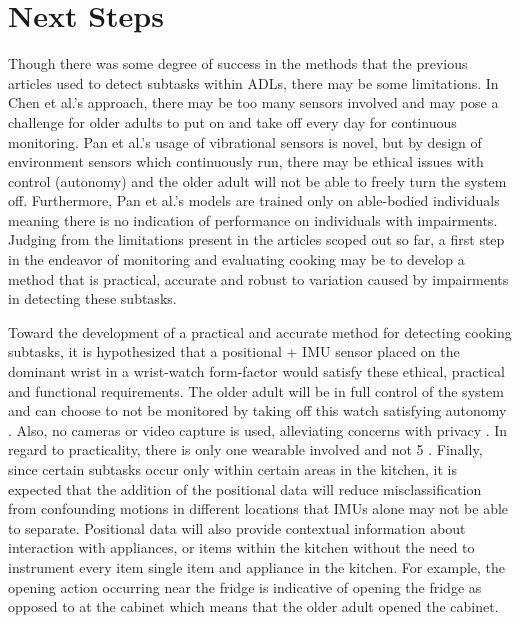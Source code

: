 \section{Next Steps}
Though there was some degree of success in the methods that the previous articles used to detect subtasks within ADLs, there may be some limitations. In Chen et al.'s approach, there may be too many sensors involved and may pose a challenge for older adults to put on and take off every day for continuous monitoring. Pan et al.'s usage of vibrational sensors is novel, but by design of environment sensors which continuously run, there may be ethical issues with control (autonomy) and the older adult will not be able to freely turn the system off. Furthermore, Pan et al.'s models are trained only on able-bodied individuals meaning there is no indication of performance on individuals with impairments. Judging from the limitations present in the articles scoped out so far, a first step in the endeavor of monitoring and evaluating cooking may be to develop a method that is practical, accurate and robust to variation caused by impairments in detecting these subtasks. 

Toward the development of a practical and accurate method for detecting cooking subtasks, it is hypothesized that a positional + IMU sensor placed on the dominant wrist in a wrist-watch form-factor would satisfy these ethical, practical and functional requirements. The older adult will be in full control of the system and can choose to not be monitored by taking off this watch satisfying autonomy \cite{chung_ethical_2016}. Also, no cameras or video capture is used, alleviating concerns with privacy \cite{demiris_privacy_2009}. In regard to practicality, there is only one wearable involved and not 5 \cite{chen_measuring_2021}. Finally, since certain subtasks occur only within certain areas in the kitchen, it is expected that the addition of the positional data will reduce misclassification from confounding motions in different locations that IMUs alone may not be able to separate. Positional data will also provide contextual information about interaction with appliances, or items within the kitchen without the need to instrument every item single item and appliance in the kitchen. For example, the opening action occurring near the fridge is indicative of opening the fridge as opposed to at the cabinet which means that the older adult opened the cabinet. 

